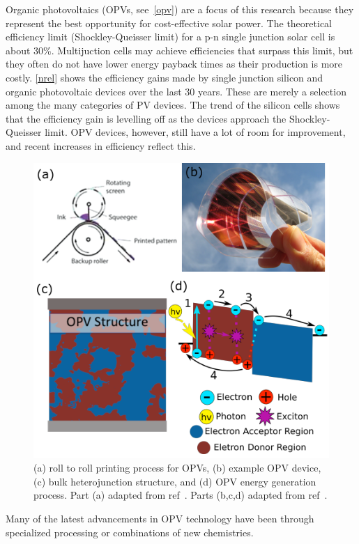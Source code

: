 Organic photovoltaics (OPVs, see~\autoref{opv}) are a focus of this research because they represent the best opportunity for cost-effective solar power.
The theoretical efficiency limit (Shockley-Queisser limit) for a p-n single junction solar cell is about 30\%\cite{Shockley1961}.
Multijuction cells may achieve efficiencies that surpass this limit, but they often do not have lower energy payback times as their production is more costly.
\autoref{nrel} shows the efficiency gains made by single junction silicon and organic photovoltaic devices over the last 30 years.
These are merely a selection among the many categories of PV devices.
The trend of the silicon cells shows that the efficiency gain is levelling off as the devices approach the Shockley-Queisser limit.
OPV devices, however, still have a lot of room for improvement, and recent increases in efficiency reflect this.
\begin{figure}
    \centering
    \includegraphics[width=\linewidth]{images/dou-miller2018c-fig.pdf}
    \caption{(a) roll to roll printing process for OPVs, (b) example OPV device, (c) bulk heterojunction structure, and (d) OPV energy generation process. Part (a) adapted from ref~\cite{Dou2013}. Parts (b,c,d) adapted from ref~\cite{Miller2018c}.}\label{opv}
\end{figure}
Many of the latest advancements in OPV technology have been through specialized processing or combinations of new chemistries.
